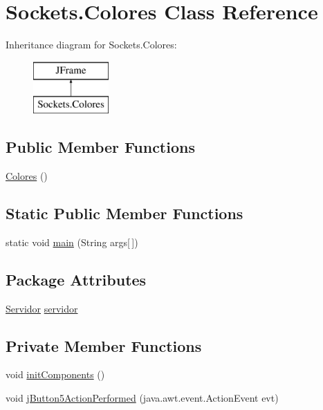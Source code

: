 \hypertarget{class_sockets_1_1_colores}{}\section{Sockets.\+Colores Class Reference}
\label{class_sockets_1_1_colores}
Inheritance diagram for Sockets.\+Colores\+:\begin{figure}[H]
\begin{center}
\leavevmode
\includegraphics[height=2.000000cm]{class_sockets_1_1_colores}
\end{center}
\end{figure}
\subsection*{Public Member Functions}
\begin{DoxyCompactItemize}
\item 
\mbox{\hyperlink{class_sockets_1_1_colores_a1d4e4f3b911aef7557c9dacd277afd67}{Colores}} ()
\end{DoxyCompactItemize}
\subsection*{Static Public Member Functions}
\begin{DoxyCompactItemize}
\item 
static void \mbox{\hyperlink{class_sockets_1_1_colores_a0ae8f636007e78298110dbf1dcbedca7}{main}} (String args\mbox{[}$\,$\mbox{]})
\end{DoxyCompactItemize}
\subsection*{Package Attributes}
\begin{DoxyCompactItemize}
\item 
\mbox{\hyperlink{class_sockets_1_1_servidor}{Servidor}} \mbox{\hyperlink{class_sockets_1_1_colores_a89813ab2c57db5af75da62b9419481f9}{servidor}}
\end{DoxyCompactItemize}
\subsection*{Private Member Functions}
\begin{DoxyCompactItemize}
\item 
void \mbox{\hyperlink{class_sockets_1_1_colores_aac354d879e1d011b0612ebaf0c312df9}{init\+Components}} ()
\item 
void \mbox{\hyperlink{class_sockets_1_1_colores_a02b7b95d6d82af2a358d2d6a358a742b}{j\+Button5\+Action\+Performed}} (java.\+awt.\+event.\+Action\+Event evt)
\end{DoxyCompactItemize}
